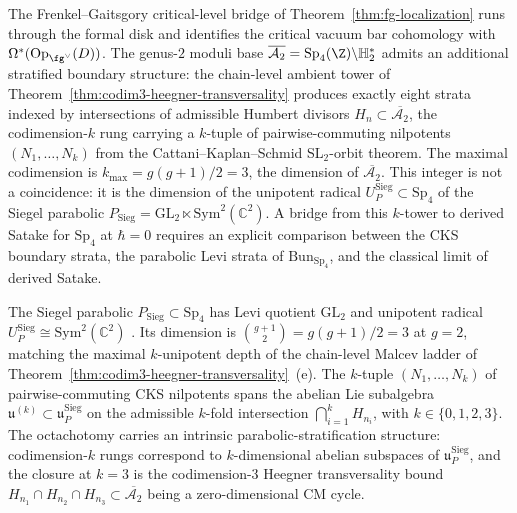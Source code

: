 \providecommand{\AbarTwo}{\overline{\mathcal{A}_2}}
\providecommand{\AbarThree}{\overline{\mathcal{A}_3}}
\providecommand{\BunSp}{\mathrm{Bun}_{\mathrm{Sp}_4}}
\providecommand{\BunMp}{\mathrm{Bun}_{\widetilde{\mathrm{Sp}}_4}}
\providecommand{\Mp}{\widetilde{\mathrm{Sp}}}
\providecommand{\GRT}{\mathrm{GRT}}
\providecommand{\grt}{\mathfrak{grt}}
\providecommand{\Perv}{\mathrm{Perv}}
\providecommand{\Satakech}{\mathrm{Sat}^{\mathrm{ch}}}

The Frenkel--Gaitsgory critical-level bridge of
Theorem~\ref{thm:fg-localization} runs through the formal disk and
identifies the critical vacuum bar cohomology with
$\Omega^*(\mathrm{Op}_{\fg^\vee}(D))$. The genus-$2$ moduli base
$\AbarTwo=\mathrm{Sp}_4(\Z)\backslash\mathbb{H}_2^*$ admits an
additional stratified boundary structure: the chain-level ambient tower of
Theorem~\textup{\ref{thm:codim3-heegner-transversality}} produces
exactly eight strata indexed by intersections of admissible Humbert
divisors $H_n\subset\AbarTwo$, the codimension-$k$ rung carrying a
$k$-tuple of pairwise-commuting nilpotents $(N_1,\ldots,N_k)$ from
the Cattani--Kaplan--Schmid SL$_2$-orbit theorem. The maximal
codimension is $k_{\max}=g(g+1)/2=3$, the dimension of
$\AbarTwo$. This integer is not a coincidence: it is the dimension
of the unipotent radical
$U_P^{\mathrm{Sieg}}\subset\mathrm{Sp}_4$ of the Siegel parabolic
$P_{\mathrm{Sieg}}=\mathrm{GL}_2\ltimes\mathrm{Sym}^2(\mathbb{C}^2)$.
A bridge from this $k$-tower to derived Satake for $\mathrm{Sp}_4$ at
$\hbar=0$ requires an explicit comparison between the CKS boundary
strata, the parabolic Levi strata of $\BunSp$, and the classical
limit of derived Satake.

\begin{remark}
\label{rem:dl-siegel-unip}
%
%
The Siegel parabolic $P_{\mathrm{Sieg}}\subset\mathrm{Sp}_4$ has Levi
quotient $\mathrm{GL}_2$ and unipotent radical
$U_P^{\mathrm{Sieg}}\cong\mathrm{Sym}^2(\mathbb{C}^2)$
\cite[Ch.~II, \S 1]{FaltingsChai1990}. Its dimension is
$\binom{g+1}{2}=g(g+1)/2=3$ at $g=2$, matching the maximal
$k$-unipotent depth of the chain-level Malcev ladder of
Theorem~\textup{\ref{thm:codim3-heegner-transversality}}~(e). The
$k$-tuple $(N_1,\ldots,N_k)$ of pairwise-commuting CKS nilpotents
spans the abelian Lie subalgebra
$\mathfrak{u}^{(k)}\subset\mathfrak{u}_P^{\mathrm{Sieg}}$ on the
admissible $k$-fold intersection $\bigcap_{i=1}^k H_{n_i}$, with
$k\in\{0,1,2,3\}$. The octachotomy carries an intrinsic
parabolic-stratification structure: codimension-$k$ rungs
correspond to $k$-dimensional abelian subspaces of
$\mathfrak{u}_P^{\mathrm{Sieg}}$, and the closure at $k=3$ is the
codimension-$3$ Heegner transversality bound
$H_{n_1}\cap H_{n_2}\cap H_{n_3}\subset\AbarTwo$ being a
zero-dimensional CM cycle.
\end{remark}

